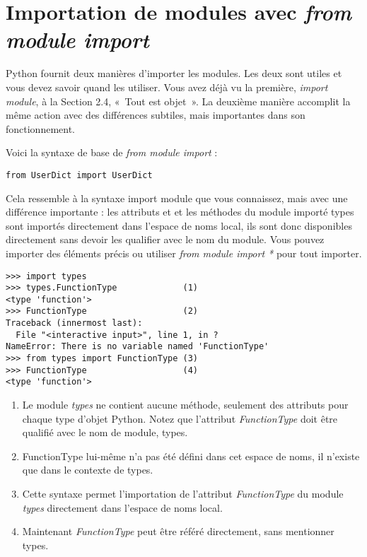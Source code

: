 \section{Importation de modules avec \emph{from module import}}
Python fournit deux manières d'importer les modules. Les deux sont utiles et vous devez savoir quand les utiliser. Vous avez déjà vu la première, \emph{import module}, à la Section 2.4, «~Tout est objet~». La deuxième manière accomplit la même action avec des différences subtiles, mais importantes dans son fonctionnement.

\medskip
\noindent Voici la syntaxe de base de \emph{from module import} :
\begin{lstlisting}
from UserDict import UserDict
\end{lstlisting}

Cela ressemble à la syntaxe import module que vous connaissez, mais avec une différence importante : les attributs et et les méthodes du module importé types sont importés directement dans l'espace de noms local, ils sont donc disponibles directement sans devoir les qualifier avec le nom du module. Vous pouvez importer des éléments précis ou utiliser \emph{from module import *} pour tout importer.



\begin{example}
\begin{lstlisting}
>>> import types
>>> types.FunctionType             (1)
<type 'function'>
>>> FunctionType                   (2)
Traceback (innermost last):
  File "<interactive input>", line 1, in ?
NameError: There is no variable named 'FunctionType'
>>> from types import FunctionType (3)
>>> FunctionType                   (4)
<type 'function'>
\end{lstlisting}
\end{example}

\begin{enumerate}
\item{Le module \emph{types} ne contient aucune méthode, seulement des attributs pour chaque type d'objet Python. Notez que l'attribut \emph{FunctionType} doit être qualifié avec le nom de module, types.}
\item{FunctionType lui-même n'a pas été défini dans cet espace de noms, il n'existe que dans le contexte de types.}
\item{Cette syntaxe permet l'importation de l'attribut \emph{FunctionType} du module \emph{types} directement dans l'espace de noms local.}
\item{Maintenant \emph{FunctionType} peut être référé directement, sans mentionner types.}
\end{enumerate}

